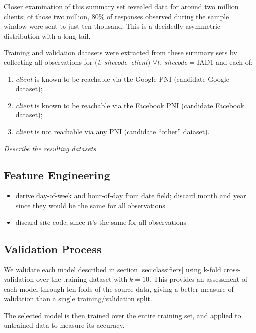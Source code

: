 \documentclass[conference]{IEEEtran}
\let\tightlist\relax %
\begin{document}
Closer examination of this summary set revealed data for around two
million clients; of those two million, 80\% of responses observed during
the sample window were sent to just ten thousand. This is a decidedly
asymmetric distribution with a long tail.

Training and validation datasets were extracted from these summary sets
by collecting all observations for (\emph{t}, \emph{sitecode},
\emph{client}) \(\forall t\), \emph{sitecode} = IAD1 and each of:

\begin{enumerate}
\def\labelenumi{\arabic{enumi}.}
\tightlist
\item
  \emph{client} is known to be reachable via the Google PNI (candidate
  Google dataset);
\item
  \emph{client} is known to be reachable via the Facebook PNI (candidate
  Facebook dataset);
\item
  \emph{client} is not reachable via any PNI (candidate ``other''
  dataset).
\end{enumerate}

\emph{Describe the resulting datasets}

\subsection{Feature Engineering}\label{sec:feature-engineering}

\begin{itemize}
\tightlist
\item
  derive day-of-week and hour-of-day from date field; discard month and
  year since they would be the same for all observations
\item
  discard site code, since it's the same for all observations
\end{itemize}

\subsection{Validation Process}\label{sec:validation-process}

We validate each model described in section \ref{sec:classifiers} using
k-fold cross-validation over the training dataset with \(k=10\). This
provides an assessment of each model through ten folds of the source
data, giving a better measure of validation than a single
training/validation split.

The selected model is then trained over the entire training set, and
applied to untrained data to measure its accuracy.
\end{document}
